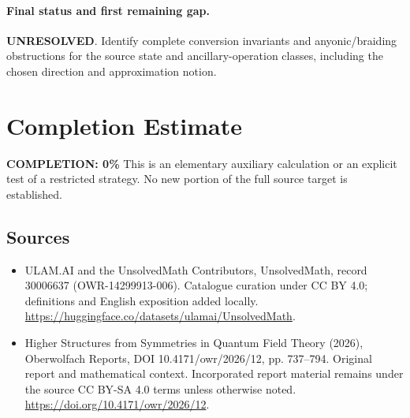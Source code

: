 \documentclass[11pt]{article}
\begin{document}
\paragraph{Final status and first remaining gap.}
\textbf{UNRESOLVED}. Identify complete conversion invariants and anyonic/braiding obstructions for the source state and ancillary-operation classes, including the chosen direction and approximation notion.

\section{Completion Estimate}
\noindent\textbf{COMPLETION: 0\%}
This is an elementary auxiliary calculation or an explicit test of a restricted strategy. No new portion of the full source target is established.

\subsection{Sources}
\begin{itemize}
\item[\hypertarget{source:30006637:1}{S1}] ULAM.AI and the UnsolvedMath Contributors, UnsolvedMath, record 30006637 (OWR-14299913-006). Catalogue curation under CC BY 4.0; definitions and English exposition added locally.
\url{https://huggingface.co/datasets/ulamai/UnsolvedMath}.
\item[\hypertarget{source:30006637:2}{S2}] Higher Structures from Symmetries in Quantum Field Theory (2026), Oberwolfach Reports, DOI 10.4171/owr/2026/12, pp. 737--794. Original report and mathematical context. Incorporated report material remains under the source CC BY-SA 4.0 terms unless otherwise noted.
\url{https://doi.org/10.4171/owr/2026/12}.
\end{itemize}
\label{end:30006637}
\end{document}
